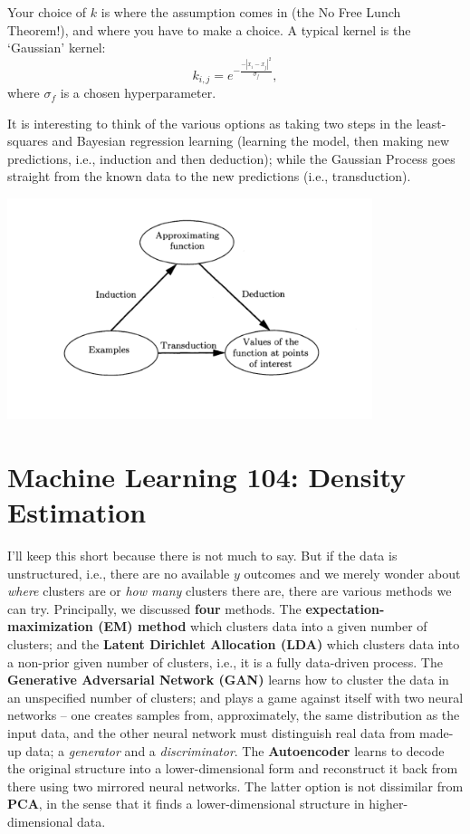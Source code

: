 \documentclass{article}
\begin{document}
Your choice of $k$ is where the assumption comes in (the No Free Lunch Theorem!), and where you have to make a choice. A typical kernel is the `Gaussian' kernel:
\begin{equation}
    k_{i,j} = e^{-\frac{-|x_i-x_j|^2}{\sigma_f}},
\end{equation}
where $\sigma_f$ is a chosen hyperparameter.


It is interesting to think of the various options as taking two steps in the least-squares and Bayesian regression learning (learning the model, then making new predictions, i.e., induction and then deduction); while the Gaussian Process goes straight from the known data to the new predictions (i.e., transduction).
\begin{center}\includegraphics[width=0.8\textwidth]{indetransudction.png}\end{center}


\section{Machine Learning 104: Density Estimation}
I'll keep this short because there is not much to say. But if the data is unstructured, i.e., there are no available $y$ outcomes and we merely wonder about \textit{where} clusters are or \textit{how many} clusters there are, there are various methods we can try. Principally, we discussed \textbf{four} methods. The \textbf{expectation-maximization (EM) method} which clusters data into a given number of clusters; and the \textbf{Latent Dirichlet Allocation (LDA)} which clusters data into a non-prior given number of clusters, i.e., it is a fully data-driven process. The \textbf{Generative Adversarial Network (GAN)} learns how to cluster the data in an unspecified number of clusters; and plays a game against itself with two neural networks -- one creates samples from, approximately, the same distribution as the input data, and the other neural network must distinguish real data from made-up data; a \textit{generator} and a \textit{discriminator}. The \textbf{Autoencoder} learns to decode the original structure into a lower-dimensional form and reconstruct it back from there using two mirrored neural networks. The latter option is not dissimilar from \textbf{PCA}, in the sense that it finds a lower-dimensional structure in higher-dimensional data.
\end{document}
